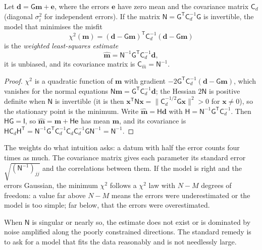 \begin{theorem}\label{thm:b3:seismology-imaging:wls}
Let $\mathbf d = \mathsf G\mathbf m + \mathbf e$, where the errors $\mathbf e$
have zero mean and the covariance matrix $\mathsf C_d$ (diagonal
$\sigma_i^2$ for independent errors). If the matrix
$\mathsf N = \mathsf G^{\mathsf T}\mathsf C_d^{-1}\mathsf G$ is invertible, the
model that minimises the misfit
\[
  \chi^2(\mathbf m) = (\mathbf d - \mathsf G\mathbf m)^{\mathsf T}\mathsf C_d^{-1}
  (\mathbf d - \mathsf G\mathbf m)
\]
is the \emph{weighted least-squares estimate}
\[
  \hat{\mathbf m} = \mathsf N^{-1}\mathsf G^{\mathsf T}\mathsf C_d^{-1}\mathbf d ,
\]
it is unbiased, and its covariance matrix is
$\mathsf C_{\hat m} = \mathsf N^{-1}$.
\end{theorem}

\begin{proof}
$\chi^2$ is a quadratic function of $\mathbf m$ with gradient
$-2\mathsf G^{\mathsf T}\mathsf C_d^{-1}(\mathbf d - \mathsf G\mathbf m)$, which
vanishes for the normal equations $\mathsf N\mathbf m = \mathsf G^{\mathsf T}
\mathsf C_d^{-1}\mathbf d$; the Hessian $2\mathsf N$ is positive definite when
$\mathsf N$ is invertible (it is then $\mathbf x^{\mathsf T}\mathsf N\mathbf x =
\|\mathsf C_d^{-1/2}\mathsf G\mathbf x\|^2 > 0$ for $\mathbf x \ne 0$), so the
stationary point is the minimum. Write $\hat{\mathbf m} = \mathsf H\mathbf d$ with
$\mathsf H = \mathsf N^{-1}\mathsf G^{\mathsf T}\mathsf C_d^{-1}$. Then
$\mathsf H\mathsf G = \mathsf I$, so $\hat{\mathbf m} = \mathbf m + \mathsf H\mathbf e$
has mean $\mathbf m$, and its covariance is
$\mathsf H\mathsf C_d\mathsf H^{\mathsf T} =
\mathsf N^{-1}\mathsf G^{\mathsf T}\mathsf C_d^{-1}\mathsf C_d\mathsf C_d^{-1}
\mathsf G\mathsf N^{-1} = \mathsf N^{-1}$.
\end{proof}

The weights do what intuition asks: a datum with half the error counts four
times as much. The covariance matrix gives each parameter its standard error
$\sqrt{(\mathsf N^{-1})_{jj}}$ and the correlations between them. If the model
is right and the errors Gaussian, the minimum $\chi^2$ follows a $\chi^2$ law
with $N - M$ degrees of freedom: a value far above $N - M$ means the errors
were underestimated or the model is too simple; far below, that the errors
were overestimated.

When $\mathsf N$ is singular or nearly so, the estimate does not exist or is
dominated by noise amplified along the poorly constrained directions. The
standard remedy is to ask for a model that fits the data reasonably and is not
needlessly large.

